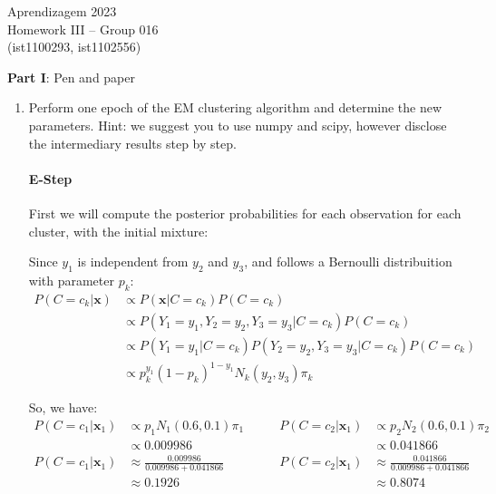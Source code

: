 \documentclass[12pt]{article}
\begin{document}
\newcommand{\prob}{\textrm{P}}
\newcommand{\ind}{\perp\!\!\!\!\!\perp} 
\newcommand{\notind}{\not\perp\!\!\!\!\!\perp}
\newcommand{\defeq}{\vcentcolon=}

\center
Aprendizagem 2023\\
Homework III -- Group 016\\
(ist1100293, ist1102556)\vskip 1cm

\large{\textbf{Part I}: Pen and paper}\normalsize

\begin{enumerate}[leftmargin=\labelsep]
    \item Perform one epoch of the EM clustering algorithm and determine the new parameters.
    Hint: we suggest you to use numpy and scipy, however disclose the intermediary results step by step.

    \paragraph{E-Step} First we will compute the posterior probabilities for each observation for each cluster, with the initial mixture:

    Since $y_1$ is independent from $y_2$ and $y_3$, and follows a Bernoulli distribuition with parameter $p_k$:
    \begin{equation}
    \begin{aligned}
        P(C=c_k|\mathbf{x}) &\propto P(\mathbf{x}|C=c_k)P(C=c_k) \\
        &\propto P(Y_1 = y_1, Y_2 = y_2, Y_3= y_3|C=c_k)P(C=c_k) \\
        &\propto P(Y_1 = y_1|C=c_k)P(Y_2 = y_2, Y_3=y_3|C=c_k)P(C=c_k) \\
        &\propto p_k^{y_1}(1-p_k)^{1-y_1}N_k(y_2, y_3)\pi_k
    \end{aligned}
    \end{equation}

    So, we have:
    \begin{equation}
    \begin{aligned}
        P(C=c_1|\mathbf{x}_1) &\propto p_1N_1(0.6, 0.1)\pi_1 &\qquad P(C=c_2|\mathbf{x}_1) &\propto p_2N_2(0.6, 0.1)\pi_2 \\
        &\propto 0.009986 &\qquad &\propto 0.041866 \\
        P(C=c_1|\mathbf{x}_1) &\approx \frac{0.009986}{0.009986+0.041866} &\qquad P(C=c_2|\mathbf{x}_1) &\approx \frac{0.041866}{0.009986+0.041866} \\
        &\approx 0.1926 &\qquad &\approx 0.8074
    \end{aligned}
    \end{equation}


\end{enumerate}
\end{document}
